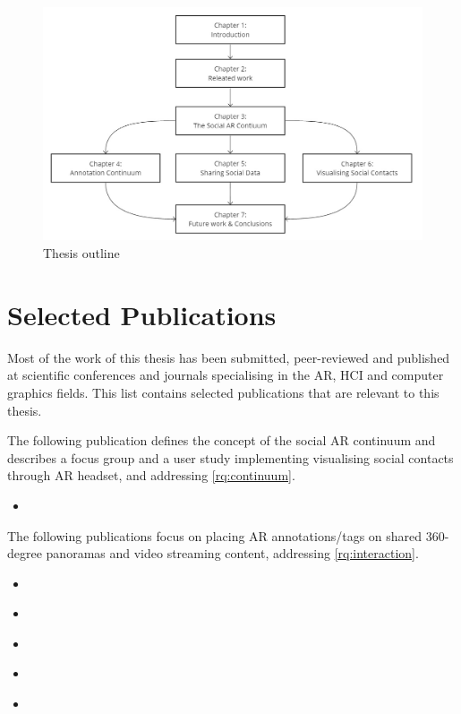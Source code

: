 \begin{figure}
    \centering
    \includegraphics[width=\linewidth]{images/thesis-outline.png}
    \caption{Thesis outline}
    \label{fig:thesis-outline}
\end{figure}

\section{Selected Publications}
\preto{}

Most of the work of this thesis has been submitted, peer-reviewed and published at scientific conferences and journals specialising in the AR, HCI and computer graphics fields. This list contains selected publications that are relevant to this thesis. 

The following publication defines the concept of the social AR continuum and describes a focus group and a user study implementing visualising social contacts through AR headset, and addressing \ref{rq:continuum}. 

\begin{itemize}
    \item{ }
\end{itemize}

The following publications focus on placing AR annotations/tags on shared 360-degree panoramas and video streaming content, addressing \ref{rq:interaction}.

\begin{itemize}
    \item{ }
    \item{ }
    \item{ }    
    \item{ }
    \item{ }
\end{itemize}

